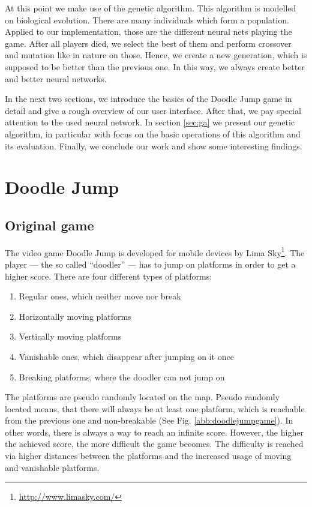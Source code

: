 \documentclass[a4paper,12pt,pagesize,headsepline,bibtotoc,titlepage,abstracton]{scrartcl}
\newcommand{\quot}[1]{{``#1''}}
\begin{document}
At this point we make use of the genetic algorithm. This algorithm is modelled on biological evolution. There are many individuals which form a population. Applied to our implementation, those are the different neural nets playing the game. After all players died, we select the best of them and perform crossover and mutation like in nature on those. Hence, we create a new generation, which is supposed to be better than the previous one. In this way, we always create better and better neural networks.

In the next two sections, we introduce the basics of the Doodle Jump game in detail and give a rough overview of our user interface. After that, we pay special attention to the used neural network. In section \ref{sec:ga} we present our genetic algorithm, in particular with focus on the basic operations of this algorithm and its evaluation. Finally, we conclude our work and show some interesting findings.

\section{Doodle Jump}
\subsection{Original game}

The video game Doodle Jump is developed for mobile devices by Lima Sky\footnote{\url{http://www.limasky.com/}}. The player --- the so called \quot{doodler} --- has to jump on platforms in order to get a higher score. There are four different types of platforms:
\begin{enumerate}
    \item Regular ones, which neither move nor break
    \item Horizontally moving platforms
    \item Vertically moving platforms
    \item Vanishable ones, which disappear after jumping on it once
    \item Breaking platforms, where the doodler can not jump on
\end{enumerate}
The platforms are pseudo randomly located on the map. Pseudo randomly located means, that there will always be at least one platform, which is reachable from the previous one and non-breakable (See Fig. \ref{abb:doodlejumpgame}). In other words, there is always a way to reach an infinite score. However, the higher the achieved score, the more difficult the game becomes. The difficulty is reached via higher distances between the platforms and the increased usage of moving and vanishable platforms.
\end{document}
